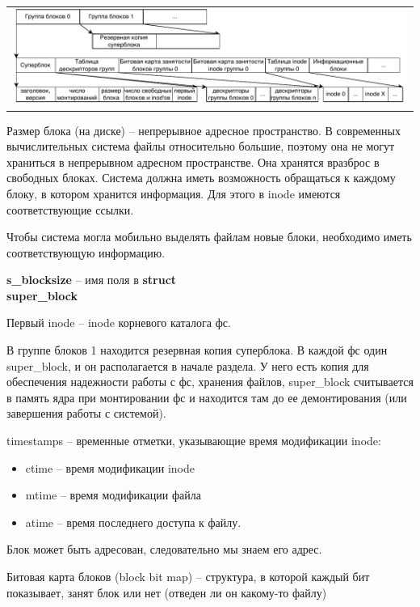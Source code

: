 \begin{table}[h!]
  \centering
  \begin{tabular}{p{1\linewidth}}
    \centering
    \includegraphics[width=1\linewidth]{./images/partition.pdf}
  \end{tabular}
\end{table}

\par Размер блока (на диске) -- непрерывное адресное пространство. В современных вычислительных система файлы относительно большие, поэтому она не могут храниться в непрерывном адресном пространстве. Она хранятся вразброс в свободных блоках. Система должна иметь возможность обращаться к каждому блоку, в котором хранится информация. Для этого в inode имеются соответствующие ссылки.
\par Чтобы система могла мобильно выделять файлам новые блоки, необходимо иметь соответствующую информацию.
\par \textbf{s\_blocksize} -- имя поля в \textbf{struct \\ super\_block}
\par Первый inode -- inode корневого каталога фс.

В группе блоков 1 находится резервная копия суперблока. В каждой фс один super\_block, и он располагается в начале раздела. У него есть копия для обеспечения надежности работы с фс, хранения файлов, super\_block считывается в память ядра при монтировании фс и находится там до ее демонтирования (или завершения работы с системой).

timestamps -- временные отметки, указывающие время модификации inode: 
\begin{itemize}
\item ctime -- время модификации inode
\item mtime -- время модификации файла
\item atime -- время последнего доступа к файлу.
\end{itemize}

Блок может быть адресован, следовательно мы знаем его адрес.

Битовая карта блоков (block bit map) -- структура, в которой каждый бит показывает, занят блок или нет (отведен ли он какому-то файлу)


